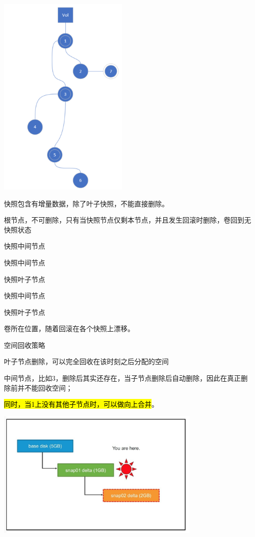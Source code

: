\begin{center}
\includegraphics[height=10cm]{../imgs/snapshot/snaptree.png}
\end{center}

快照包含有增量数据，除了叶子快照，不能直接删除。
\begin{enumbox}
\item 根节点，不可删除，只有当快照节点仅剩本节点，并且发生回滚时删除，卷回到无快照状态
\item 快照中间节点
\item 快照中间节点
\item 快照叶子节点
\item 快照中间节点
\item 快照叶子节点
\item 卷所在位置，随着回滚在各个快照上漂移。
\end{enumbox}

空间回收策略
\begin{enumbox}
\item 叶子节点删除，可以完全回收在该时刻之后分配的空间
\item 中间节点，比如3，删除后其实还存在，当子节点删除后自动删除，因此在真正删除前并不能回收空间；
\item \hl{同时，当1上没有其他子节点时，可以做向上合并}。
\end{enumbox}

\begin{center}
\includegraphics[width=10cm]{../imgs/snapshot/snap-delete-leaf.png}
\end{center}

